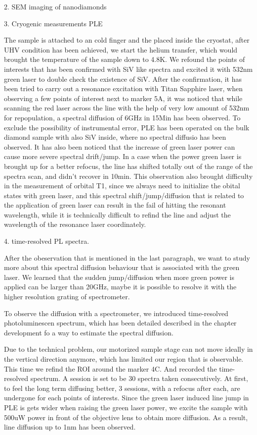 \FloatBarrier

2. SEM imaging of nanodiamonds




3. Cryogenic measurements PLE
 
The sample is attached to an cold finger and the placed inside the cryostat, after UHV condition has been achieved, we start the helium transfer, which would brought the temperature of the sample down to 4.8K. We refound the points of interests that has been confirmed with SiV like spectra and excited it with 532nm green laser to double check the existence of SiV. After the confirmation, it has been tried to carry out a resonance excitation with Titan Sapphire laser, when observing a few points of interest next to marker 5A, it was noticed that while scanning the red laser across the line with the help of very low amount of 532nm for repopulation, a spectral diffusion of 6GHz in 15Min has been observed. To exclude the possibility of instrumental error, PLE has been operated on the bulk diamond sample with also SiV inside, where no spectral diffusio has been observed. It has also been noticed that the increase of green laser power can cause more severe spectral drift/jump. In a case when the power green laser is brought up for a better refocus, the line has shifted totally out of the range of the spectra scan, and didn't recover in 10min. This observation also brought difficulty in the measurement of orbital T1, since we always need to initialize the obital states with green laser, and this spectral shift/jump/diffusion that is related to the application of green laser can result in the fail of hitting the resonant wavelength, while it is technically difficult to refind the line and adjust the wavelength of the resonance laser coordinately. 

4. time-resolved PL spectra.

After the obeservation that is mentioned in the last paragraph, we want to study more about this spectral diffusion behaviour that is associated with the green laser. We learned that the sudden jump/diffusion when more green power is applied can be larger than 20GHz, maybe it is possible to resolve it with the higher resolution grating of spectrometer. 

To observe the diffusion with a spectrometer, we introduced time-resolved photoluminescen spectrum, which has been detailed described in the chapter development fo a way to estimate the spectral diffusion.

Due to the technical problem, our motorized sample stage can not move ideally in the vertical direction anymore, which has limited our region that is observable. This time we refind the ROI around the marker 4C. And recorded the time-resolved spectrum. A session is set to be 30 spectra taken consecutively. At first, to feel the long term diffusing better, 3 sessions, with a refocus after each, are undergone for each points of interests. Since the green laser induced line jump in PLE is gets wider when raising the green laser power, we excite the sample with 500uW power in front of the objective lens to obtain more diffusion. As a result, line diffusion up to 1nm has been observed.


